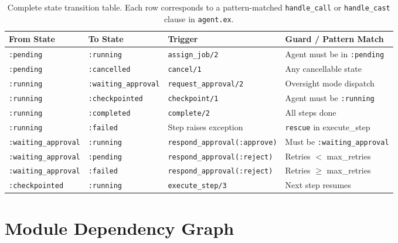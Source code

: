 \documentclass[12pt,a4paper]{article}
\theoremstyle{definition}
\theoremstyle{remark}
\begin{document}
\begin{table}[H]
\centering
\small
\begin{tabular}{@{}llll@{}}
\toprule
\textbf{From State} & \textbf{To State} & \textbf{Trigger} & \textbf{Guard / Pattern Match} \\
\midrule
\texttt{:pending} & \texttt{:running} & \texttt{assign\_job/2} & Agent must be in \texttt{:pending} \\
\texttt{:pending} & \texttt{:cancelled} & \texttt{cancel/1} & Any cancellable state \\
\texttt{:running} & \texttt{:waiting\_approval} & \texttt{request\_approval/2} & Oversight mode dispatch \\
\texttt{:running} & \texttt{:checkpointed} & \texttt{checkpoint/1} & Agent must be \texttt{:running} \\
\texttt{:running} & \texttt{:completed} & \texttt{complete/2} & All steps done \\
\texttt{:running} & \texttt{:failed} & Step raises exception & \texttt{rescue} in execute\_step \\
\texttt{:waiting\_approval} & \texttt{:running} & \texttt{respond\_approval(:approve)} & Must be \texttt{:waiting\_approval} \\
\texttt{:waiting\_approval} & \texttt{:pending} & \texttt{respond\_approval(:reject)} & Retries $<$ max\_retries \\
\texttt{:waiting\_approval} & \texttt{:failed} & \texttt{respond\_approval(:reject)} & Retries $\geq$ max\_retries \\
\texttt{:checkpointed} & \texttt{:running} & \texttt{execute\_step/3} & Next step resumes \\
\bottomrule
\end{tabular}
\caption{Complete state transition table. Each row corresponds to a pattern-matched \texttt{handle\_call} or \texttt{handle\_cast} clause in \texttt{agent.ex}.}\label{tab:state-transitions}
\end{table}

\section{Module Dependency Graph}\label{app:dependencies}
\end{document}
